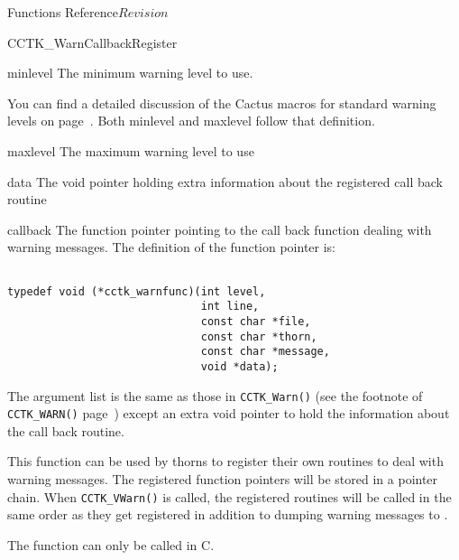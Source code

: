 \begin{cactuspart}{ Functions Reference}{}{$Revision$}
\begin{FunctionDescription}{CCTK\_WarnCallbackRegister}
\begin{ParameterSection}
\begin{Parameter}{minlevel}
The minimum warning level to use.

You can find a detailed discussion of the Cactus macros for standard
warning levels on page~\pageref{CCTK-VInfo}. Both minlevel and maxlevel follow
that definition.

\end{Parameter}

\begin{Parameter}{maxlevel}
The maximum warning level to use

\end{Parameter}

\begin{Parameter}{data}
The void pointer holding extra information about the registered call back
routine
\end{Parameter}

\begin{Parameter}{callback}
The function pointer pointing to the call back function dealing with
warning messages. The definition of the function pointer is:
\begin{verbatim}

typedef void (*cctk_warnfunc)(int level,
                              int line,
                              const char *file,
                              const char *thorn,
                              const char *message,
                              void *data);

\end{verbatim}

The argument list is the same as those in \verb|CCTK_Warn()|
(see the footnote of \verb|CCTK_WARN()| page~\pageref{CCTK-WARN})
except an extra void pointer to hold the information about the call
back routine.

\end{Parameter}

\end{ParameterSection}

\begin{Discussion}
This function can be used by thorns to register their own routines to
deal with warning messages. The registered function pointers will be
stored in a pointer chain. When \verb|CCTK_VWarn()| is called, the
registered routines will be called in the same order as they get
registered in addition to dumping warning messages to .

The function can only be called in C.
\end{Discussion}


\end{FunctionDescription}
\end{cactuspart}
